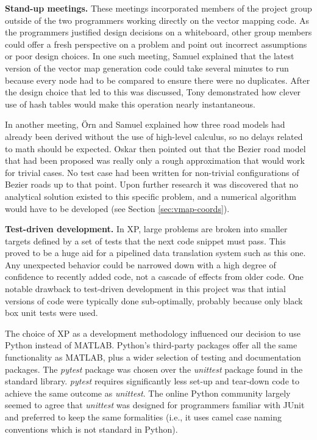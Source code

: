 \documentclass[12pt,twoside]{article}
\begin{document}
\textbf{Stand-up meetings.}
These meetings incorporated members of the project group outside of the two programmers working directly on the vector mapping code. As the programmers justified design decisions on a whiteboard, other group members could offer a fresh perspective on a problem and point out incorrect assumptions or poor design choices. In one such meeting, Samuel explained that the latest version of the vector map generation code could take several minutes to run because every node had to be compared to ensure there were no duplicates. After the design choice that led to this was discussed, Tony demonstrated how clever use of hash tables would make this operation nearly instantaneous.

In another meeting, Örn and Samuel explained how three road models had already been derived without the use of high-level calculus, so no delays related to math should be expected. Oskar then pointed out that the Bezier road model that had been proposed was really only a rough approximation that would work for trivial cases. No test case had been written for non-trivial configurations of Bezier roads up to that point. Upon further research it was discovered that no analytical solution existed to this specific problem, and a numerical algorithm would have to be developed (see Section \ref{sec:vmap-coords}).

\textbf{Test-driven development.}
In XP, large problems are broken into smaller targets defined by a set of tests that the next code snippet must pass. This proved to be a huge aid for a pipelined data translation system such as this one. Any unexpected behavior could be narrowed down with a high degree of confidence to recently added code, not a cascade of effects from older code. One notable drawback to test-driven development in this project was that intial versions of code were typically done sub-optimally, probably because only black box unit tests were used.

The choice of XP as a development methodology influenced our decision to use Python instead of MATLAB. Python's third-party packages offer all the same functionality as MATLAB, plus a wider selection of testing and documentation packages. The \textit{pytest} package was chosen over the \textit{unittest} package found in the standard library. \textit{pytest} requires significantly less set-up and tear-down code to achieve the same outcome as \textit{unittest}. The online Python community largely seemed to agree that \textit{unittest} was designed for programmers familiar with JUnit and preferred to keep the same formalities (i.e., it uses camel case naming conventions which is not standard in Python).
\end{document}
